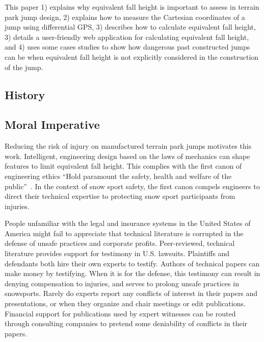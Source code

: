 \documentclass{article}
\begin{document}
This paper 1) explains why equivalent fall height is important to assess in
terrain park jump design, 2) explains how to measure the Cartesian coordinates
of a jump using differential GPS, 3) describes how to calculate equivalent fall
height, 3) details a user-friendly web application for calculating equivalent
fall height, and 4) uses some cases studies to show how dangerous past
constructed jumps can be when equivalent fall height is not explicitly
considered in the construction of the jump.

\subsection{History}
%

\subsection{Moral Imperative}
%
Reducing the risk of injury on manufactured terrain park jumps motivates this
work. Intelligent, engineering design based on the laws of mechanics can shape
features to limit equivalent fall height. This complies with the first canon of
engineering ethics ``Hold paramount the safety, health and welfare of the
public''~\cite{NSPE2019}. In the context of snow sport safety, the first canon
compels engineers to direct their technical expertise to protecting snow sport
participants from injuries.

People unfamiliar with the legal and insurance systems in the United States of
America might fail to appreciate that technical literature is corrupted in the
defense of unsafe practices and corporate profits. Peer-reviewed, technical
literature provides support for testimony in U.S. lawsuits. Plaintiffs and
defendants both hire their own experts to testify. Authors of technical papers
can make money by testifying. When it is for the defense, this testimony can
result in denying compensation to injuries, and serves to prolong unsafe
practices in snowsports. Rarely do experts report any conflicts of interest in
their papers and presentations, or when they organize and chair meetings or
edit publications. Financial support for publications used by expert witnesses
can be routed through consulting companies to pretend some deniability of
conflicts in their papers.
\end{document}
